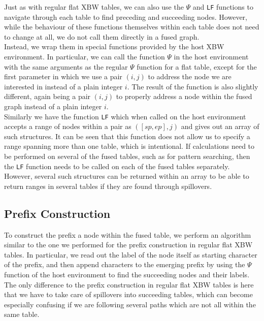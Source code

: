 \documentclass[a4paper,12pt,twoside,BCOR=10mm]{scrbook}
\begin{document}
Just as with regular flat XBW tables, we can also use the $ \Psi $ and \texttt{LF} functions
to navigate through each table to find preceding and succeeding nodes.
However, while the behaviour of these functions themselves within each table does not need to change
at all, we do not call them directly in a fused graph. \\
Instead, we wrap them in special functions provided by the host XBW environment.
In particular, we can call the function $\Psi$ in the host environment with the same arguments
as the regular $ \Psi $ function for a flat table, except for the first parameter
in which we use a pair $ (i, j) $ to address the node
we are interested in instead of a plain integer $ i $.
The result of the function is also slightly different, again being a pair $ (i, j) $ to
properly address a node within the fused graph instead of a plain integer $ i $. \\
Similarly we have the function \texttt{LF} which when called on the host environment accepts a range of nodes
within a pair as $ ([sp, ep], j) $ and gives out an array of such structures.
It can be seen that this function does not allow us to specify a range spanning more
than one table, which is intentional. If calculations need to be performed on
several of the fused tables, such as for pattern searching, then the \texttt{LF} function
needs to be called on each of the fused tables separately.
However, several such structures can be returned within an array to be able to return
ranges in several tables if they are found through spillovers.


\subsection{Prefix Construction}

To construct the prefix a node within the fused table,
we perform an algorithm similar to the one we performed for the prefix construction
in regular flat XBW tables.
In particular, we read out the label of the node itself as starting character of the prefix,
and then append characters to the emerging prefix by using the $\Psi$ function of the host environment to
find the succeeding nodes and their labels.
The only difference to the prefix construction in regular flat XBW tables
is here that we have to take care of spillovers into succeeding tables,
which can become especially confusing if we are following several paths which are not all
within the same table.
\end{document}
